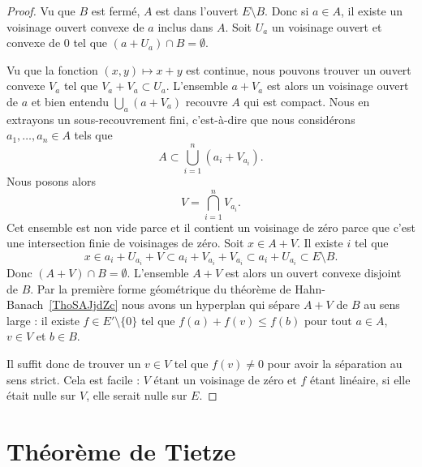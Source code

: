 \begin{proof}
    Vu que \( B\) est fermé, \( A\) est dans l'ouvert \( E\setminus B\). Donc si \( a\in A\), il existe un voisinage ouvert convexe de \( a\) inclus dans \( A\). Soit \( U_a\) un voisinage ouvert et convexe de \( 0\) tel que \( (a+U_a)\cap B=\emptyset\).

    Vu que la fonction \( (x,y)\mapsto x+y\) est continue, nous pouvons trouver un ouvert convexe \( V_a\) tel que \( V_a+V_a\subset U_a\). L'ensemble \( a+V_a\) est alors un voisinage ouvert de \( a\) et bien entendu \( \bigcup_a(a+V_a)\) recouvre \( A\) qui est compact. Nous en extrayons un sous-recouvrement fini, c'est-à-dire que nous considérons \( a_1,\ldots, a_n\in A\) tels que
    \begin{equation}
        A\subset \bigcup_{i=1}^n(a_i+V_{a_i}).
    \end{equation}
    Nous posons alors
    \begin{equation}
        V=\bigcap_{i=1}^nV_{a_i}.
    \end{equation}
    Cet ensemble est non vide parce et il contient un voisinage de zéro parce que c'est une intersection finie de voisinages de zéro. Soit \( x\in A+V\). Il existe \( i\) tel que
    \begin{equation}
        x\in a_i+U_{a_i}+V\subset a_i+V_{a_i}+V_{a_i}\subset a_i+U_{a_i}\subset E\setminus B.
    \end{equation}
    Donc \( (A+V)\cap B=\emptyset\). L'ensemble \( A+V\) est alors un ouvert convexe disjoint de \( B\). Par la première forme géométrique du théorème de Hahn-Banach~\ref{ThoSAJjdZc} nous avons un hyperplan qui sépare \( A+V\) de \( B\) au sens large : il existe \( f\in E'\setminus\{ 0 \}\) tel que \( f(a)+f(v)\leq f(b)\) pour tout \( a\in A\), \( v\in V\) et \( b\in B\).

    Il suffit donc de trouver un \( v\in V\) tel que \( f(v)\neq 0\) pour avoir la séparation au sens strict. Cela est facile : \( V\) étant un voisinage de zéro et \( f\) étant linéaire, si elle était nulle sur \( V\), elle serait nulle sur \( E\).
\end{proof}

\section{Théorème de Tietze}


